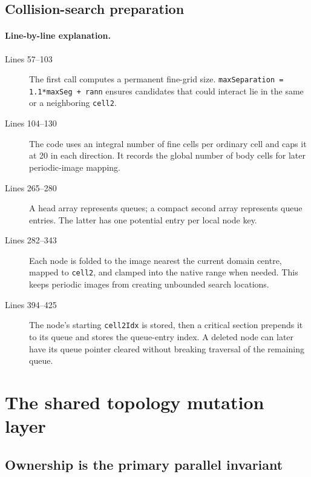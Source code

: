 \documentclass[11pt]{article}
\newcommand{\code}[1]{\texorpdfstring{\nolinkurl{#1}}{#1}}
\begin{document}
\subsection{Collision-search preparation}





\paragraph{Line-by-line explanation.}
\begin{description}
\item[Lines 57--103] The first call computes a permanent fine-grid size.
\code{maxSeparation = 1.1*maxSeg + rann} ensures candidates that could
interact lie in the same or a neighboring \code{cell2}.
\item[Lines 104--130] The code uses an integral number of fine cells per
ordinary cell and caps it at 20 in each direction. It records the global
number of body cells for later periodic-image mapping.
\item[Lines 265--280] A head array represents queues; a compact second array
represents queue entries. The latter has one potential entry per local node
key.
\item[Lines 282--343] Each node is folded to the image nearest the current
domain centre, mapped to \code{cell2}, and clamped into the native range when
needed. This keeps periodic images from creating unbounded search locations.
\item[Lines 394--425] The node's starting \code{cell2Idx} is stored, then a
critical section prepends it to its queue and stores the queue-entry index.
A deleted node can later have its queue pointer cleared without breaking
traversal of the remaining queue.
\end{description}

\section{The shared topology mutation layer}

\subsection{Ownership is the primary parallel invariant}
\end{document}
